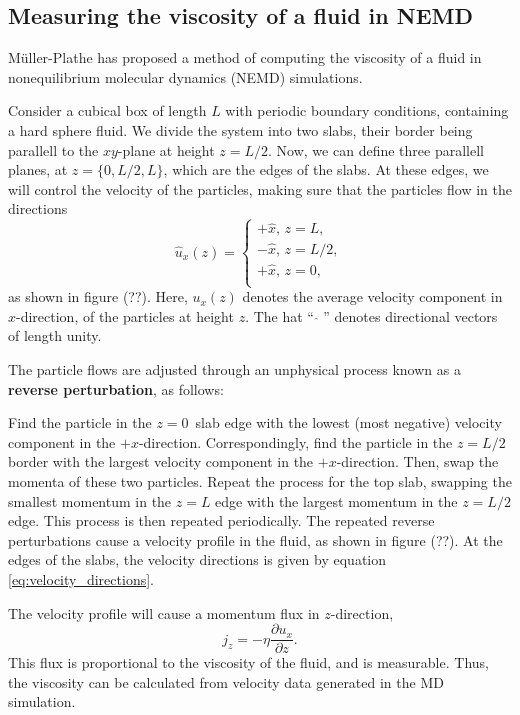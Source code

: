 \subsection{Measuring the viscosity of a fluid in NEMD}
Müller-Plathe \cite{ref:mullerplathe:reversing_the_perturbation} 
has proposed a method of computing the viscosity of a fluid in 
nonequilibrium molecular dynamics (NEMD) simulations.

Consider a cubical box of length $L$ with periodic 
boundary conditions, containing a hard sphere fluid.
We divide the system into two slabs, their border being 
parallell to the $xy$-plane at height $z = L/2$.
Now, we can define three parallell planes, at 
$z = \{0, L/2, L\}$, which are the edges of the slabs.
At these edges, we will control the velocity of the particles, 
making sure that the particles flow in the directions
\begin{equation}
    \label{eq:velocity_directions}
    \hat{u}_x(z) =
    \begin{cases}
        +\hat{x}, \,z = L,    \\
        -\hat{x}, \,z = L/2,  \\
        +\hat{x}, \,z = 0,    \\
    \end{cases}
\end{equation}
as shown in figure (??). %
Here, $u_x(z)$ denotes the average velocity component 
in $x$-direction, of the particles at height $z$.
The hat ``$\,\, \hat{ } \,\,$'' denotes 
directional vectors of length unity.

The particle flows are adjusted through an unphysical process known as a 
\textbf{reverse perturbation}\cite{ref:mullerplathe:reversing_the_perturbation},
as follows:

Find the particle in the $z = 0$ slab edge with the lowest 
(most negative) velocity component in the $+x$-direction.
Correspondingly, find the particle in the $z = L/2$ border 
with the largest velocity component in the $+x$-direction.
Then, swap the momenta of these two particles.
Repeat the process for the top slab, swapping the smallest momentum 
in the $z = L$ edge with the largest momentum in the $z = L/2$ edge.
This process is then repeated periodically.
The repeated reverse perturbations cause a velocity profile in the fluid,
as shown in figure (??). %
At the edges of the slabs, the velocity directions 
is given by equation \eqref{eq:velocity_directions}.

The velocity profile will cause a momentum flux in $z$-direction,
\begin{equation}
    \label{eq:momentum_flux}
    j_z = -\eta \frac{\partial u_x}{\partial z}.
\end{equation}
This flux is proportional to the viscosity of the fluid, and is measurable.
Thus, the viscosity can be calculated from velocity data generated in the 
MD simulation.

